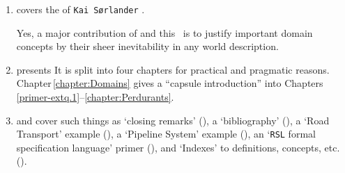 \begin{enumerate}
\item {} covers the  of
      \texttt{Kai S{\o}rlander}
      \cite{kaisorlander1994,kaisorlander1997,kaisorlander2002,kaisorlander2016,kaisorlander2022}.

      Yes, a major contribution of \cite{BjornerMonograph2020} and
      this \primer\ is to justify important domain concepts by
      their sheer inevitability in any world description.
      
\item {} presents  It is split into four chapters for practical
    and pragmatic
    reasons. Chapter\,\ref{chapter:Domains} gives a ``capsule
    introduction'' into Chapters\,\,\ref{primer-extq.1}--\ref{chapter:Perdurants}.
  
\item {}
  and  cover
  such things as `closing remarks' (\sort{\ref{chapter:Closing}}), a `bibliography' (\sort{\ref{primer.bib}}), a `Road
  Transport' example (\sort{\ref{Chapter:Road Transport}}), a `Pipeline System' example (\sort{\ref{appendix:Pipelines}}), an `\texttt{RSL}
  formal specification language' primer (\sort{\ref{RSL-intro}}), and `Indexes' to definitions, concepts, etc. (\sort{\ref{primer.indexes}}).
\end{enumerate}

\label{Prerequisite Skills}


